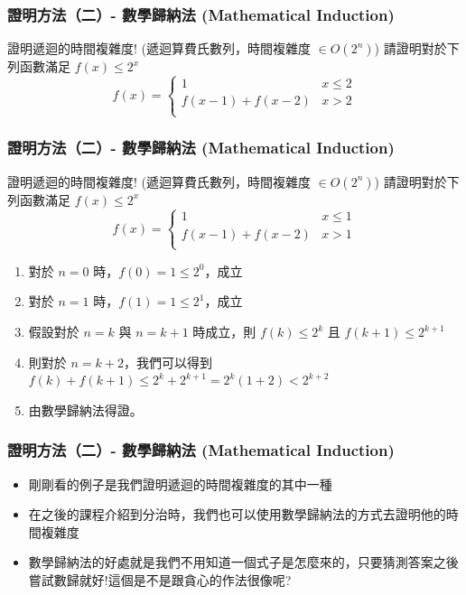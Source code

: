 \documentclass[aspectratio=169]{beamer}
\begin{document}
\begin{frame}
\frametitle{證明方法（二）- 數學歸納法 (Mathematical Induction)}
    \begin{block}{證明遞迴的時間複雜度! (遞迴算費氏數列，時間複雜度 $\in  O(2^n)$)}
        請證明對於下列函數滿足 $f(x) \le 2^x$
        $$f(x) = \begin{cases} 
                 1  & x \le 2 \\
                 f(x-1)+f(x-2) & x > 2 \\
               \end{cases}$$
    \end{block}
\end{frame}

\begin{frame}
\frametitle{證明方法（二）- 數學歸納法 (Mathematical Induction)}
    \begin{block}{證明遞迴的時間複雜度! (遞迴算費氏數列，時間複雜度 $\in O(2^n)$)}
        請證明對於下列函數滿足 $f(x) \le 2^x$
        $$f(x) = \begin{cases} 
                 1  & x \le 1 \\
                 f(x-1)+f(x-2) & x > 1 \\
               \end{cases}$$
    \end{block}
    
    \begin{enumerate}
        \item<1-> 對於 $n=0$ 時，$f(0) = 1 \le 2^0$，成立
        \item<1-> 對於 $n=1$ 時，$f(1) = 1 \le 2^1$，成立
        \item<2-> 假設對於 $n = k$ 與 $n=k+1$ 時成立，則 $f(k) \le 2^k$ 且 $f(k+1) \le 2^{k+1}$
        \item<3-> 則對於 $n=k+2$，我們可以得到 $f(k)+f(k+1) \le 2^k+2^{k+1} = 2^k(1+2) < 2^{k+2}$
        \item<4-> 由數學歸納法得證。
    \end{enumerate}
\end{frame}

\begin{frame}
\frametitle{證明方法（二）- 數學歸納法 (Mathematical Induction)}
    \begin{itemize}
        \item<1-> 剛剛看的例子是我們證明遞迴的時間複雜度的其中一種
        \item<1-> 在之後的課程介紹到分治時，我們也可以使用數學歸納法的方式去證明他的時間複雜度
        \item<2-> 數學歸納法的好處就是我們不用知道一個式子是怎麼來的，只要猜測答案之後嘗試數歸就好!這個是不是跟貪心的作法很像呢?
    \end{itemize}
\end{frame}
\end{document}
